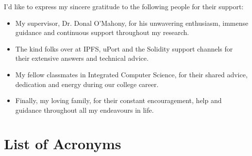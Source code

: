 \documentclass[a4paper, 12pt, oneside]{report}
\begin{document}
\begin{thesisacknowledgments}
I'd like to express my sincere gratitude to the following people for their support:

\begin{itemize}
	\item My supervisor, Dr. Donal O'Mahony, for his unwavering enthusiasm, immense guidance and continuous support throughout my research.
    \item The kind folks over at IPFS, uPort and the Solidity support channels for their extensive answers and technical advice.
    \item My fellow classmates in Integrated Computer Science, for their shared advice, dedication and energy during our college career.
    \item Finally, my loving family, for their constant encouragement, help and guidance throughout all my endeavours in life.
\end{itemize}
   
\end{thesisacknowledgments}

\tableofcontents
\listoffigures
\listoftables

\chapter*{List of Acronyms}
\begin{acronym}
\end{acronym}












\begin{appendix}
  
\end{appendix}
\end{document}
